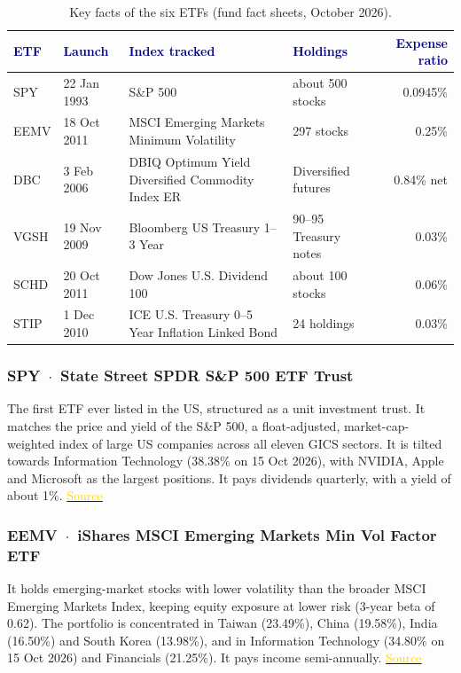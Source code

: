 \documentclass[10pt,a4paper]{article}
\renewcommand{\arraystretch}{1.3}
\newcommand{\hd}[1]{\textcolor{navy}{\textbf{#1}}}
\begin{document}
\begin{table}[H]
\centering
\small
\renewcommand{\arraystretch}{1.25}
\begin{tabularx}{\textwidth}{@{}l l >{\raggedright\arraybackslash}X l r@{}}
\toprule
\hd{ETF} & \hd{Launch} & \hd{Index tracked} & \hd{Holdings} & \hd{Expense ratio}\\
\midrule
SPY  & 22 Jan 1993 & S\&P 500 & about 500 stocks & 0.0945\%\\
EEMV & 18 Oct 2011 & MSCI Emerging Markets Minimum Volatility & 297 stocks & 0.25\%\\
DBC  & 3 Feb 2006  & DBIQ Optimum Yield Diversified Commodity Index ER & Diversified futures & 0.84\% net\\
VGSH & 19 Nov 2009 & Bloomberg US Treasury 1--3 Year & 90--95 Treasury notes & 0.03\%\\
SCHD & 20 Oct 2011 & Dow Jones U.S. Dividend 100 & about 100 stocks & 0.06\%\\
STIP & 1 Dec 2010  & ICE U.S. Treasury 0--5 Year Inflation Linked Bond & 24 holdings & 0.03\%\\
\bottomrule
\end{tabularx}
\caption{Key facts of the six ETFs (fund fact sheets, October 2026).}
\label{tab:etfs}
\end{table}

\subsubsection*{SPY \,$\cdot$\, State Street SPDR S\&P 500 ETF Trust}
The first ETF ever listed in the US, structured as a unit investment trust. It matches the price and yield of the
S\&P 500, a float-adjusted, market-cap-weighted index of large US companies across all eleven GICS sectors.
It is tilted towards Information Technology (38.38\% on 15 Oct 2026), with NVIDIA, Apple and Microsoft as the largest
positions. It pays dividends quarterly, with a yield of about 1\%.
\href{https://www.ssga.com/us/en/intermediary/etfs/state-street-spdr-sp-500-etf-trust-spy}{\textcolor{gold}{Source}}

\subsubsection*{EEMV \,$\cdot$\, iShares MSCI Emerging Markets Min Vol Factor ETF}
It holds emerging-market stocks with lower volatility than the broader MSCI Emerging Markets Index, keeping
equity exposure at lower risk (3-year beta of 0.62). The portfolio is concentrated in Taiwan (23.49\%),
China (19.58\%), India (16.50\%) and South Korea (13.98\%), and in Information Technology
(34.80\% on 15 Oct 2026) and Financials (21.25\%). It pays income semi-annually.
\href{https://www.ishares.com/us/products/239641/ishares-msci-emerging-markets-minimum-volatility-etf}{\textcolor{gold}{Source}}
\end{document}
